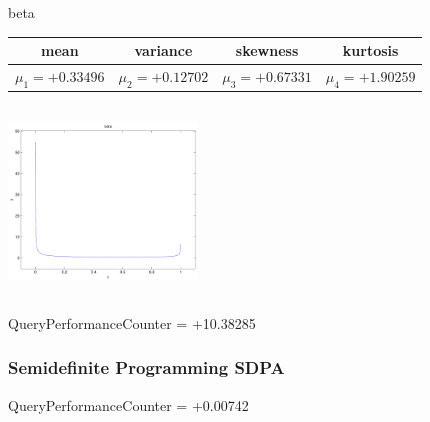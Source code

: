 \documentclass[9pt]{article}
\theoremstyle{plain}
\theoremstyle{definition}
\theoremstyle{remark}
\numberwithin{equation}{section}
\begin{document}
\newpage
beta \begin{tabular}{|c|c|c|c|}  mean & variance & skewness & kurtosis \\  \hline
$\mu_1 = +0.33496$ & $\mu_2 = +0.12702$ & $\mu_3 = +0.67331$ & $\mu_4 =+1.90259$ \\
\end{tabular}

\includegraphics[width=5cm,height=5cm]{beta.pdf}

QueryPerformanceCounter  =  +10.38285
\subsubsection{Semidefinite Programming SDPA}
QueryPerformanceCounter  =  +0.00742
\end{document}
